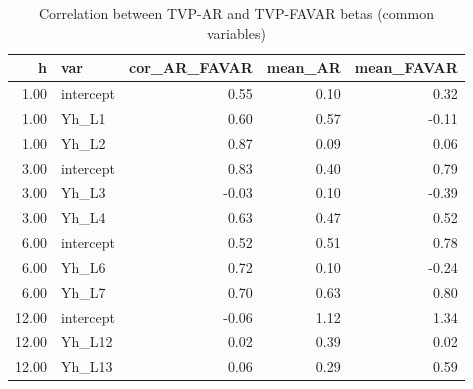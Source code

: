 \begin{table}[ht]
\centering
\begin{tabular}{rlrrr}
  \hline
h & var & cor\_AR\_FAVAR & mean\_AR & mean\_FAVAR \\ 
  \hline
1.00 & intercept & 0.55 & 0.10 & 0.32 \\ 
  1.00 & Yh\_L1 & 0.60 & 0.57 & -0.11 \\ 
  1.00 & Yh\_L2 & 0.87 & 0.09 & 0.06 \\ 
  3.00 & intercept & 0.83 & 0.40 & 0.79 \\ 
  3.00 & Yh\_L3 & -0.03 & 0.10 & -0.39 \\ 
  3.00 & Yh\_L4 & 0.63 & 0.47 & 0.52 \\ 
  6.00 & intercept & 0.52 & 0.51 & 0.78 \\ 
  6.00 & Yh\_L6 & 0.72 & 0.10 & -0.24 \\ 
  6.00 & Yh\_L7 & 0.70 & 0.63 & 0.80 \\ 
  12.00 & intercept & -0.06 & 1.12 & 1.34 \\ 
  12.00 & Yh\_L12 & 0.02 & 0.39 & 0.02 \\ 
  12.00 & Yh\_L13 & 0.06 & 0.29 & 0.59 \\ 
   \hline
\end{tabular}
\caption{Correlation between TVP-AR and TVP-FAVAR betas (common variables)} 
\label{tab:cross_ar_favar}
\end{table}
